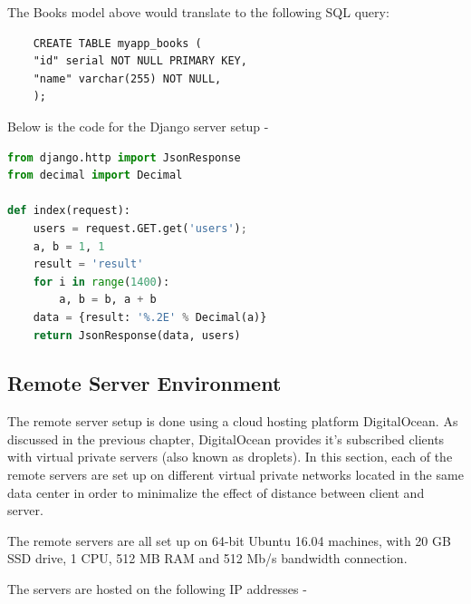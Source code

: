 \documentclass[../thesis.tex]{subfiles}
\begin{document}
	The Books model above would translate to the following SQL query:
	\begin{verbatim}
	CREATE TABLE myapp_books (
	"id" serial NOT NULL PRIMARY KEY,
	"name" varchar(255) NOT NULL,
	);
	\end{verbatim}
	Below is the code for the Django server setup - 
	\begin{lstlisting}[language=Python, caption=Django server code]
from django.http import JsonResponse
from decimal import Decimal

def index(request):
	users = request.GET.get('users');
	a, b = 1, 1
	result = 'result'
	for i in range(1400):
		a, b = b, a + b
	data = {result: '%.2E' % Decimal(a)}
	return JsonResponse(data, users)		
	\end{lstlisting}
	\subsection{Remote Server Environment}
	The remote server setup is done using a cloud hosting platform DigitalOcean. As discussed in the previous chapter, DigitalOcean provides it's subscribed clients with virtual private servers (also known as droplets). In this section, each of the remote servers are set up on different virtual private networks located in the same data center in order to minimalize the effect of distance between client and server.
	\newline
	
	The remote servers are all set up on 64-bit Ubuntu 16.04 machines, with 20 GB SSD drive, 1 CPU, 512 MB RAM and 512 Mb/s bandwidth connection.
	\newline
	
	The servers are hosted on the following IP addresses - 	
\end{document}
